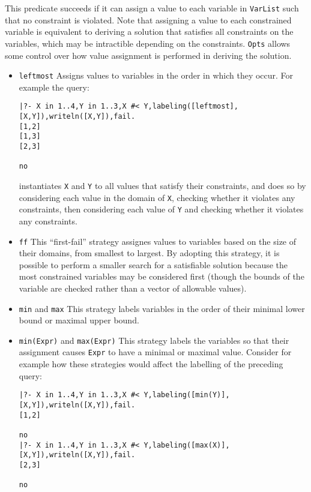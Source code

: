 \begin{description}
%
This predicate succeeds if it can assign a value to each variable in
{\tt VarList} such that no constraint is violated.  Note that
assigning a value to each constrained variable is equivalent to
deriving a solution that satisfies all constraints on the variables,
which may be intractible depending on the constraints.  {\tt Opts}
allows some control over how value assignment is performed in deriving the solution.
%
\begin{itemize}
\item {\tt leftmost} Assigns values to variables in the order in which
  they occur.  For example the query:
%
{\small
\begin{verbatim}
|?- X in 1..4,Y in 1..3,X #< Y,labeling([leftmost],[X,Y]),writeln([X,Y]),fail.
[1,2]
[1,3]
[2,3]

no
\end{verbatim}
}
%
instantiates {\tt X} and {\tt Y} to all values that satisfy their
constraints, and does so by considering each value in the domain of
{\tt X}, checking whether it violates any constraints, then
considering each value of {\tt Y} and checking whether it violates any
constraints.
%
\item {\tt ff} This ``first-fail'' strategy assignes values to
  variables based on the size of their domains, from smallest to
  largest.  By adopting this strategy, it is possible to perform a
  smaller search for a satisfiable solution because the most
  constrained variables may be considered first (though the bounds of
  the variable are checked rather than a vector of allowable values).  
%
\item {\tt min} and {\tt max} This strategy labels variables in the
  order of their minimal lower bound or maximal upper bound.
%
\item {\tt min(Expr)} and {\tt max(Expr)} This strategy labels the
  variables so that their assignment causes {\tt Expr} to have a
  minimal or maximal value.  Consider for example how these strategies
  would affect the labelling of the preceding query:
{\small
\begin{verbatim}
|?- X in 1..4,Y in 1..3,X #< Y,labeling([min(Y)],[X,Y]),writeln([X,Y]),fail.
[1,2]

no
|?- X in 1..4,Y in 1..3,X #< Y,labeling([max(X)],[X,Y]),writeln([X,Y]),fail.
[2,3]

no
\end{verbatim}
}
\end{itemize}


\end{description}

